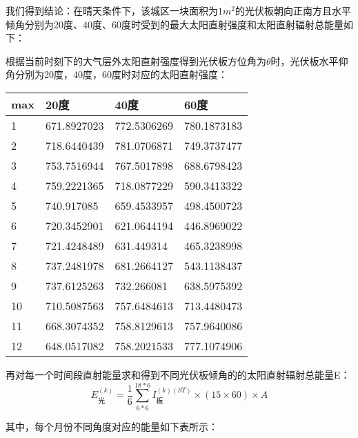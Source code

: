 \documentclass[withoutpreface,bwprint]{cumcmthesis} %
\begin{document}
我们得到结论：在晴天条件下，该城区一块面积为$1m^2$的光伏板朝向正南方且水平倾角分别为20度、40度、60度时受到的最大太阳直射强度和太阳直射辐射总能量如下：

根据当前时刻下的大气层外太阳直射强度得到光伏板方位角为$\theta$时，光伏板水平仰角分别为20度，40度，60度时对应的太阳直射强度：
\begin{table}[!ht]
	\centering
	\begin{tabular}{|l|l|l|l|}
		\hline
		max & 20度 & 40度 & 60度  \\ \hline
		1 & 671.8927023 & 772.5306269 & 780.1873183  \\ \hline
		2 & 718.6440439 & 781.0706871 & 749.3737477  \\ \hline
		3 & 753.7516944 & 767.5017898 & 688.6798423  \\ \hline
		4 & 759.2221365 & 718.0877229 & 590.3413322  \\ \hline
		5 & 740.917085 & 659.4533957 & 498.4500723  \\ \hline
		6 & 720.3452901 & 621.0644194 & 446.8969022  \\ \hline
		7 & 721.4248489 & 631.449314 & 465.3238998  \\ \hline
		8 & 737.2481978 & 681.2664127 & 543.1138437  \\ \hline
		9 & 737.6125263 & 732.266081 & 638.5975392  \\ \hline
		10 & 710.5087563 & 757.6484613 & 713.4480473  \\ \hline
		11 & 668.3074352 & 758.8129613 & 757.9640086  \\ \hline
		12 & 648.0517082 & 758.2021533 & 777.1074906  \\ \hline
	\end{tabular}
\end{table}


\newpage

再对每一个时间段直射能量求和得到不同光伏板倾角的的太阳直射辐射总能量E：
\begin{equation}
	E_{\mbox{光}}^{(k)} = \frac{1}{6} \sum_{6*6}^{18*6} I_{\mbox{板}}^{(k)(ST)} \times (15 \times 60) \times A
	\label{eq:014}
\end{equation}

其中，每个月份不同角度对应的能量如下表所示：
\end{document}
